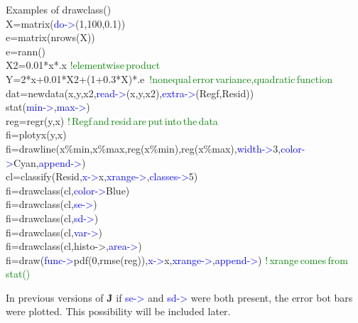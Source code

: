 \begin{example}[drawclassex]Examples of \textcolor{VioletRed}{drawclass}()\\
\label{drawclassex}
X=\textcolor{VioletRed}{matrix}(\textcolor{blue}{do->}(1,100,0.1))\\
e=\textcolor{VioletRed}{matrix}(\textcolor{VioletRed}{nrows}(X))\\
e=\textcolor{VioletRed}{rann}()\\
X2=0.01*x*.x \textcolor{green}{!elementwise\,product}\\
Y=2*x+0.01*X2+(1+0.3*X)*.e \,\textcolor{green}{!nonequal\,error\,variance,quadratic\,function}\\
dat=\textcolor{VioletRed}{newdata}(x,y,x2,\textcolor{blue}{read->}(x,y,x2),\textcolor{blue}{extra->}(Regf,Resid))\\
\textcolor{VioletRed}{stat}(\textcolor{blue}{min->},\textcolor{blue}{max->})\\
reg=\textcolor{VioletRed}{regr}(y,x) \textcolor{green}{!\,Regf\,and\,resid\,are\,put\,into\,the\,data}\\
fi=\textcolor{VioletRed}{plotyx}(y,x)\\
fi=\textcolor{VioletRed}{drawline}(x\%min,x\%max,reg(x\%min),reg(x\%max),\textcolor{blue}{width->}3,\textcolor{blue}{color->}Cyan,\textcolor{blue}{append->})\\
cl=\textcolor{VioletRed}{classify}(Resid,\textcolor{blue}{x->}x,\textcolor{blue}{xrange->},\textcolor{blue}{classes->}5)\\
fi=\textcolor{VioletRed}{drawclass}(cl,\textcolor{blue}{color->}Blue)\\
fi=\textcolor{VioletRed}{drawclass}(cl,\textcolor{blue}{se->})\\
fi=\textcolor{VioletRed}{drawclass}(cl,\textcolor{blue}{sd->})\\
fi=\textcolor{VioletRed}{drawclass}(cl,\textcolor{blue}{var->})\\
fi=\textcolor{VioletRed}{drawclass}(cl,histo->,\textcolor{blue}{area->})\\
fi=\textcolor{VioletRed}{draw}(\textcolor{blue}{func->}\textcolor{VioletRed}{pdf}(0,\textcolor{VioletRed}{rmse}(reg)),\textcolor{blue}{x->}x,\textcolor{blue}{xrange->},\textcolor{blue}{append->}) \textcolor{green}{!\,xrange\,comes\,from\,\textcolor{VioletRed}{stat}()}
\end{example}
\begin{note}
In previous versions of \textbf{J} if \textcolor{blue}{se->} and \textcolor{blue}{sd->} were both present, the error
bot bars were plotted. This possibility will be included later.
\end{note}
